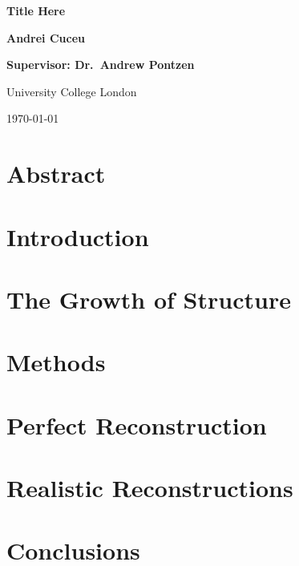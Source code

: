 \documentclass[12pt,aas_macros,twoside]{report}
\begin{document}
\begin{titlepage}
    \begin{center}
        
        \vspace*{5cm}
        {\fontsize{50}{60}\selectfont \textbf{Title Here}}
        
        
        \vspace{3cm}
        
        \Huge
        \textbf{Andrei Cuceu}
        
        
        \vspace{1cm}
        
        \huge
        \textbf{Supervisor: Dr.\ Andrew Pontzen}
        
        \vspace{8cm}
        
        \huge
        University College London
        
        \vspace{1cm}
        \huge
        \today
        
    \end{center}
\end{titlepage}



\chapter*{\Huge Abstract}

\cite{Eisenstein_BAOpeak_reconstruction}

\tableofcontents

\newpage
\chapter{Introduction}


\newpage
\chapter{The Growth of Structure}


\newpage
\chapter{Methods}


\newpage
\chapter{Perfect Reconstruction}


\newpage
\chapter{Realistic Reconstructions}


\newpage
\chapter{Conclusions}


\printbibliography{}
\end{document}
